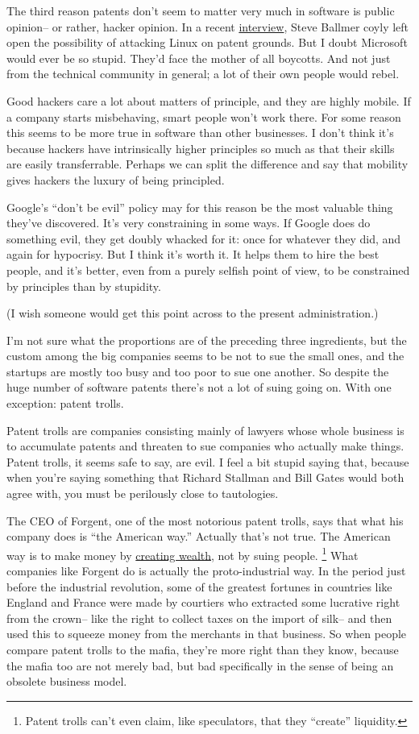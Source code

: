 The third reason patents don't seem to matter very much in software is
public opinion-- or rather, hacker opinion. In a recent
\href{http://www.computing.co.uk/forbes/news/2152720/interview-steve-ballmer-linux}{interview},
Steve Ballmer coyly left open the possibility of attacking Linux on
patent grounds. But I doubt Microsoft would ever be so stupid. They'd
face the mother of all boycotts. And not just from the technical
community in general; a lot of their own people would rebel.

Good hackers care a lot about matters of principle, and they are highly
mobile. If a company starts misbehaving, smart people won't work there.
For some reason this seems to be more true in software than other
businesses. I don't think it's because hackers have intrinsically higher
principles so much as that their skills are easily transferrable.
Perhaps we can split the difference and say that mobility gives hackers
the luxury of being principled.

Google's ``don't be evil'' policy may for this reason be the most
valuable thing they've discovered. It's very constraining in some ways.
If Google does do something evil, they get doubly whacked for it: once
for whatever they did, and again for hypocrisy. But I think it's worth
it. It helps them to hire the best people, and it's better, even from a
purely selfish point of view, to be constrained by principles than by
stupidity.

(I wish someone would get this point across to the present
administration.)

I'm not sure what the proportions are of the preceding three
ingredients, but the custom among the big companies seems to be not to
sue the small ones, and the startups are mostly too busy and too poor to
sue one another. So despite the huge number of software patents there's
not a lot of suing going on. With one exception: patent trolls.

Patent trolls are companies consisting mainly of lawyers whose whole
business is to accumulate patents and threaten to sue companies who
actually make things. Patent trolls, it seems safe to say, are evil. I
feel a bit stupid saying that, because when you're saying something that
Richard Stallman and Bill Gates would both agree with, you must be
perilously close to tautologies.

The CEO of Forgent, one of the most notorious patent trolls, says that
what his company does is ``the American way.'' Actually that's not true.
The American way is to make money by \href{wealth.html}{creating
wealth}, not by suing people. \footnote{Patent trolls can't even claim, like speculators, that they
``create'' liquidity.} What companies
like Forgent do is actually the proto-industrial way. In the period just
before the industrial revolution, some of the greatest fortunes in
countries like England and France were made by courtiers who extracted
some lucrative right from the crown-- like the right to collect taxes on
the import of silk-- and then used this to squeeze money from the
merchants in that business. So when people compare patent trolls to the
mafia, they're more right than they know, because the mafia too are not
merely bad, but bad specifically in the sense of being an obsolete
business model.

